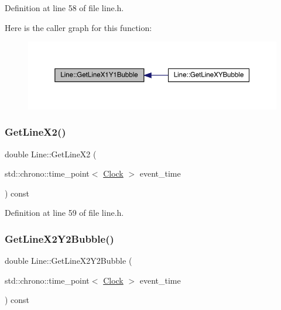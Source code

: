 Definition at line 58 of file line.\+h.

Here is the caller graph for this function\+:\nopagebreak
\begin{figure}[H]
\begin{center}
\leavevmode
\includegraphics[width=350pt]{class_line_adc3c6c42d1b3d172e32fad59db2e3eaa_icgraph}
\end{center}
\end{figure}
\mbox{\label{class_line_a9cdf38d7aaeadfa35136dd417865c189}} 
\subsubsection{\texorpdfstring{Get\+Line\+X2()}{GetLineX2()}}
{\footnotesize\ttfamily double Line\+::\+Get\+Line\+X2 (\begin{DoxyParamCaption}\item[{std\+::chrono\+::time\+\_\+point$<$ \hyperlink{universe_8h_a0ef8d951d1ca5ab3cfaf7ab4c7a6fd80}{Clock} $>$}]{event\+\_\+time }\end{DoxyParamCaption}) const\hspace{0.3cm}{\ttfamily [inline]}}



Definition at line 59 of file line.\+h.

\mbox{\label{class_line_a2432406f734963e4497541081a843131}} 
\subsubsection{\texorpdfstring{Get\+Line\+X2\+Y2\+Bubble()}{GetLineX2Y2Bubble()}}
{\footnotesize\ttfamily double Line\+::\+Get\+Line\+X2\+Y2\+Bubble (\begin{DoxyParamCaption}\item[{std\+::chrono\+::time\+\_\+point$<$ \hyperlink{universe_8h_a0ef8d951d1ca5ab3cfaf7ab4c7a6fd80}{Clock} $>$}]{event\+\_\+time }\end{DoxyParamCaption}) const\hspace{0.3cm}{\ttfamily [inline]}}



